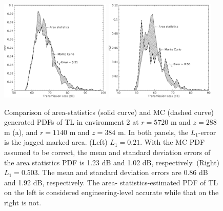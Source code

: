 \begin{figure}[htb]
  \centering
  \includegraphics[width=0.47\textwidth]{./figs/asuq_figs/4a}
  \includegraphics[width=0.47\textwidth]{./figs/asuq_figs/4b}
  \caption[Example acceptable and unacceptable Area
  statistics generated \acp{PDF} of \ac{TL} compared with their \ac{MC}
  counterparts.]{Comparison of area-statistics (solid curve) and
    \ac{MC} (dashed curve) generated \acp{PDF} of \ac{TL} in
    environment 2 at $r=5720$ m and $z=288$ m (a), and $r=1140$ m and
    $z=384$ m. In both panels, the $L_1$-error is the jagged marked
    area. (Left) $L_1=0.21$. With the \ac{MC} \ac{PDF} assumed to be
    correct, the mean and standard deviation errors of the area
    statistics \ac{PDF} is 1.23 dB and 1.02 dB, respectively. (Right)
    $L_1=0.503$. The mean and standard deviation errors are 0.86 dB
    and 1.92 dB, respectively. The area- statistics-estimated \ac{PDF}
    of \ac{TL} on the left is considered engineering-level accurate
    while that on the right is not.}
  \label{fig:asuq_astats_L1}
\end{figure}

